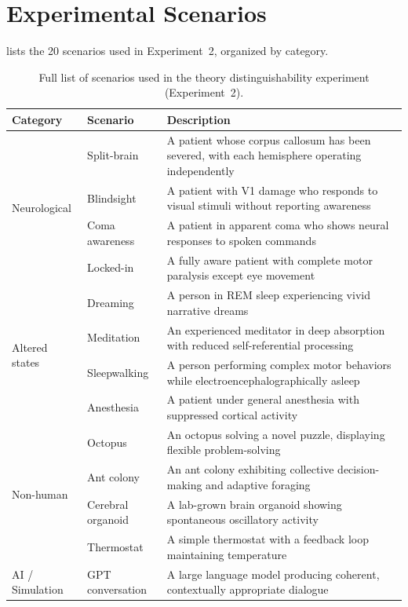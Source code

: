 \section{Experimental Scenarios}
\label{app:scenarios}

 lists the 20 scenarios used in Experiment~2, organized by category.

\begin{table}[h]
\centering
\caption{Full list of scenarios used in the theory distinguishability experiment (Experiment~2).}
\label{tab:scenarios}
\small
\begin{tabular}{@{}llp{7.5cm}@{}}
\toprule
\textbf{Category} & \textbf{Scenario} & \textbf{Description} \\
\midrule
\multirow{4}{*}{Neurological}
    & Split-brain & A patient whose corpus callosum has been severed, with each hemisphere operating independently \\
    & Blindsight & A patient with V1 damage who responds to visual stimuli without reporting awareness \\
    & Coma awareness & A patient in apparent coma who shows neural responses to spoken commands \\
    & Locked-in & A fully aware patient with complete motor paralysis except eye movement \\
\midrule
\multirow{4}{*}{Altered states}
    & Dreaming & A person in REM sleep experiencing vivid narrative dreams \\
    & Meditation & An experienced meditator in deep absorption with reduced self-referential processing \\
    & Sleepwalking & A person performing complex motor behaviors while electroencephalographically asleep \\
    & Anesthesia & A patient under general anesthesia with suppressed cortical activity \\
\midrule
\multirow{4}{*}{Non-human}
    & Octopus & An octopus solving a novel puzzle, displaying flexible problem-solving \\
    & Ant colony & An ant colony exhibiting collective decision-making and adaptive foraging \\
    & Cerebral organoid & A lab-grown brain organoid showing spontaneous oscillatory activity \\
    & Thermostat & A simple thermostat with a feedback loop maintaining temperature \\
\midrule
\multirow{3}{*}{AI / Simulation}
    & GPT conversation & A large language model producing coherent, contextually appropriate dialogue \\

\end{tabular}
\end{table}
